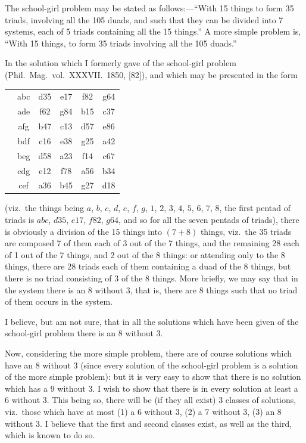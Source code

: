 \documentclass[11pt,a4paper]{article}
\theoremstyle{plain}
\begin{document}
\medskip

The school-girl problem may be stated as follows:---``With 15 things to form 35 triads, involving all the 105 duads, and such that they can be divided into 7 systems, each of 5 triads containing all the 15 things.'' A more simple problem is, ``With 15 things, to form 35 triads involving all the 105 duads.''

In the solution which I formerly gave of the school-girl problem (Phil.\ Mag.\ vol.\ XXXVII.\ 1850, [82]), and which may be presented in the form
\begin{center}
\begin{tabular}{c|ccccc}
& & & & & \\ \hline
& abc & d35 & e17 & f82 & g64 \\
& ade & f62 & g84 & b15 & c37 \\
& afg & b47 & c13 & d57 & e86 \\
& bdf & c16 & e38 & g25 & a42 \\
& beg & d58 & a23 & f14 & c67 \\
& cdg & e12 & f78 & a56 & b34 \\
& cef & a36 & b45 & g27 & d18 \\
\end{tabular}
\end{center}
(viz.\ the things being $a$, $b$, $c$, $d$, $e$, $f$, $g$, $1$, $2$, $3$, $4$, $5$, $6$, $7$, $8$, the first pentad of triads is $abc$, $d35$, $e17$, $f82$, $g64$, and so for all the seven pentads of triads), there is obviously a division of the 15 things into $(7 + 8)$ things, viz.\ the 35 triads are composed 7 of them each of 3 out of the 7 things, and the remaining 28 each of 1 out of the 7 things, and 2 out of the 8 things: or attending only to the 8 things, there are 28 triads each of them containing a duad of the 8 things, but there is no triad consisting of 3 of the 8 things. More briefly, we may say that in the system there is an 8 without 3, that is, there are 8 things such that no triad of them occurs in the system.

\newpage
I believe, but am not sure, that in all the solutions which have been given of the school-girl problem there is an 8 without 3.

Now, considering the more simple problem, there are of course solutions which have an 8 without 3 (since every solution of the school-girl problem is a solution of the more simple problem): but it is very easy to show that there is no solution which has a 9 without 3. I wish to show that there is in every solution at least a 6 without 3. This being so, there will be (if they all exist) 3 classes of solutions, viz.\ those which have at most (1) a 6 without 3, (2) a 7 without 3, (3) an 8 without 3. I believe that the first and second classes exist, as well as the third, which is known to do so.
\end{document}
